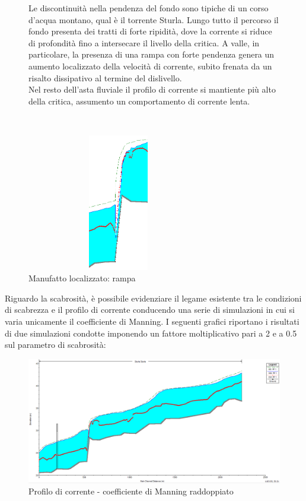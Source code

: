 \documentclass[12pt]{article} %
\begin{document}
\begin{figure}[H]
\begin{minipage}[b]{8.5cm}
\noindent Le discontinuità nella pendenza del fondo sono tipiche di un corso d'acqua montano, qual è il torrente Sturla. Lungo tutto il percorso il fondo presenta dei tratti di forte ripidità, dove la corrente si riduce di profondità fino a intersecare il livello della critica. A valle, in particolare, la presenza di una rampa con forte pendenza genera un aumento localizzato della velocità di corrente, subito frenata da un risalto dissipativo al termine del dislivello.\\
Nel resto dell'asta fluviale il profilo di corrente si mantiente più alto della critica, assumento un comportamento di corrente lenta.

\end{minipage}
\ \hspace{2mm} \hspace{3mm} \
\begin{minipage}[b]{8.5cm}
    \centering
    \includegraphics[height=6cm, width=8cm]{Risalto.PNG}
    \caption{Manufatto localizzato: rampa}
\end{minipage}
\end{figure}

\newpage

\noindent Riguardo la scabrosità, è possibile evidenziare il legame esistente tra le condizioni di scabrezza e il profilo di corrente conducendo una serie di simulazioni in cui si varia unicamente il coefficiente di Manning.
I seguenti grafici riportano i risultati di due simulazioni condotte imponendo un fattore moltiplicativo pari a 2 e a 0.5 sul parametro di scabrosità:

\begin{figure}[H]
    \centering
    \includegraphics[scale=0.45]{Manningx2.PNG}
    \caption{Profilo di corrente - coefficiente di Manning raddoppiato}
\end{figure}
\end{document}
